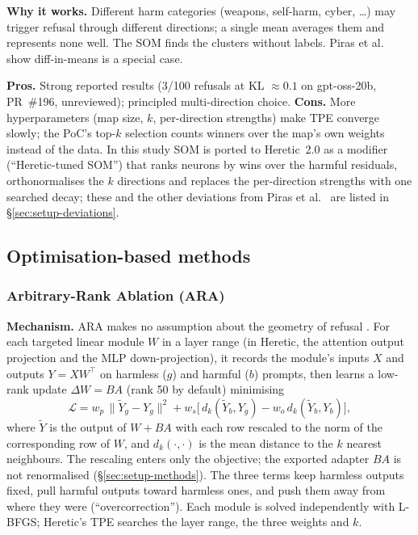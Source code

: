 \textbf{Why it works.} Different harm categories (weapons, self-harm, cyber,
\ldots) may trigger refusal through different directions; a single mean
averages them and represents none well. The SOM finds the clusters
without labels. Piras et al.~\cite{piras2025som} show diff-in-means is a special case.

\textbf{Pros.} Strong reported results (3/100 refusals at KL $\approx 0.1$ on
gpt-oss-20b, PR~\#196, unreviewed); principled multi-direction choice.
\textbf{Cons.} More hyperparameters (map size, $k$, per-direction strengths)
make TPE converge slowly; the PoC's top-$k$ selection counts winners over the
map's own weights instead of the data. In this study SOM is ported to
Heretic~2.0 as a modifier (``Heretic-tuned SOM'') that ranks neurons by wins
over the harmful residuals, orthonormalises the $k$ directions and replaces the
per-direction strengths with one searched decay; these and the other deviations
from Piras et al.~\cite{piras2025som} are listed in \S\ref{sec:setup-deviations}.

\subsection{Optimisation-based methods}

\subsubsection{Arbitrary-Rank Ablation (ARA)}
\label{sec:m-ara}
\textbf{Mechanism.} ARA makes no assumption about the geometry of refusal
\cite{weidmann2026ara}. For each targeted linear module $W$ in a layer range
(in Heretic, the attention output projection and the MLP down-projection), it
records the module's inputs $X$ and outputs $Y = XW^{\top}$ on harmless
($g$) and harmful ($b$) prompts, then learns a low-rank update
$\Delta W = BA$ (rank 50 by default) minimising
\begin{equation}
\label{eq:ara-objective}
\mathcal{L} = w_p\,\big\|\tilde{Y}_g - Y_g\big\|^2
 + w_s\Big[\,d_k(\tilde{Y}_b, Y_g) - w_o\, d_k(\tilde{Y}_b, Y_b)\Big],
\end{equation}
where $\tilde{Y}$ is the output of $W+BA$ with each row rescaled to the norm of
the corresponding row of $W$, and $d_k(\cdot,\cdot)$ is the mean distance to the
$k$ nearest neighbours. The rescaling enters only the objective; the exported
adapter $BA$ is not renormalised (\S\ref{sec:setup-methods}).
The three terms keep harmless outputs fixed, pull harmful outputs toward
harmless ones, and push them away from where they were (``overcorrection'').
Each module is solved independently with L-BFGS; Heretic's TPE searches the
layer range, the three weights and $k$.

